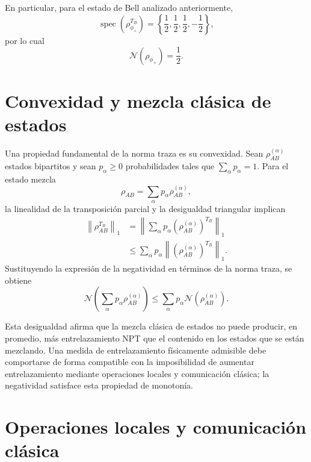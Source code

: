 \documentclass[../main.tex]{subfiles}
\begin{document}
En particular, para el estado de Bell analizado anteriormente,
\begin{equation*}
    \operatorname{spec}\left(\rho_{\phi_+}^{T_B}\right)
    =\left\{\frac{1}{2},\frac{1}{2},\frac{1}{2},-\frac{1}{2}\right\},
\end{equation*}
por lo cual
\begin{equation*}
    \mathcal{N}(\rho_{\phi_+})=\frac{1}{2}.
\end{equation*}

\section{Convexidad y mezcla clásica de estados}

Una propiedad fundamental de la norma traza es su convexidad. Sean $\rho_{AB}^{(\alpha)}$ estados bipartitos y sean $p_\alpha\geq 0$ probabilidades tales que $\sum_\alpha p_\alpha=1$. Para el estado mezcla
\begin{equation*}
    \rho_{AB}=\sum_\alpha p_\alpha\rho_{AB}^{(\alpha)},
\end{equation*}
la linealidad de la transposición parcial y la desigualdad triangular implican
\begin{align*}
    \left\|\rho_{AB}^{T_B}\right\|_1
    &=\left\|
        \sum_\alpha p_\alpha
        \left(\rho_{AB}^{(\alpha)}\right)^{T_B}
      \right\|_1 \\
    &\leq
      \sum_\alpha p_\alpha
      \left\|\left(\rho_{AB}^{(\alpha)}\right)^{T_B}\right\|_1.
\end{align*}
Sustituyendo la expresión de la negatividad en términos de la norma traza, se obtiene
\begin{equation*}
    \mathcal{N}\!\left(\sum_\alpha p_\alpha\rho_{AB}^{(\alpha)}\right)
    \leq
    \sum_\alpha p_\alpha\mathcal{N}\!\left(\rho_{AB}^{(\alpha)}\right).
\end{equation*}

Esta desigualdad afirma que la mezcla clásica de estados no puede producir, en promedio, más entrelazamiento NPT que el contenido en los estados que se están mezclando. Una medida de entrelazamiento físicamente admisible debe comportarse de forma compatible con la imposibilidad de aumentar entrelazamiento mediante operaciones locales y comunicación clásica; la negatividad satisface esta propiedad de monotonía.

\section{Operaciones locales y comunicación clásica}\label{subsec:locc}
\end{document}
